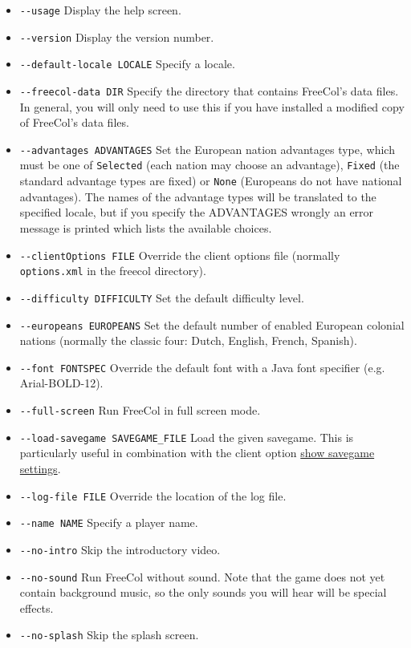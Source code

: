 \documentclass[12pt]{book}
\begin{document}
\begin{itemize}
\item\verb$--usage$ Display the help screen.
\item\verb$--version$ Display the version number.
\item\verb$--default-locale LOCALE$ Specify a locale.
\item\verb$--freecol-data DIR$ Specify the directory that contains
  FreeCol's data files. In general, you will only need to use this if
  you have installed a modified copy of FreeCol's data files.
\item\verb$--advantages ADVANTAGES$ Set the European nation advantages
  type, which must be one of \texttt{Selected} (each nation may choose
  an advantage), \texttt{Fixed} (the standard advantage types are
  fixed) or \texttt{None} (Europeans do not have national advantages).
  The names of the advantage types will be translated to the specified
  locale, but if you specify the ADVANTAGES wrongly an error message is
  printed which lists the available choices.
\item\verb$--clientOptions FILE$ Override the client options file
  (normally \texttt{options.xml} in the freecol directory).
\item\verb$--difficulty DIFFICULTY$ Set the default difficulty level.
\item\verb$--europeans EUROPEANS$ Set the default number of enabled
  European colonial nations (normally the classic four: Dutch,
  English, French, Spanish).
\item\verb$--font FONTSPEC$ Override the default font with a Java
  font specifier (e.g. Arial-BOLD-12).
\item\verb$--full-screen$ Run FreeCol in full screen mode.
\item\verb$--load-savegame SAVEGAME_FILE$ Load the given
  savegame. This is particularly useful in combination with the client
  option \hyperlink{show savegame settings}{show savegame settings}.
\item\verb$--log-file FILE$ Override the location of the log file.
\item\verb$--name NAME$ Specify a player name.
\item\verb$--no-intro$ Skip the introductory video.
\item\verb$--no-sound$ Run FreeCol without sound. Note that the game
  does not yet contain background music, so the only sounds you will
  hear will be special effects.
\item\verb$--no-splash$ Skip the splash screen.

\end{itemize}
\end{document}
